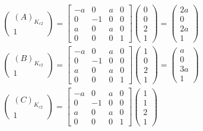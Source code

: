 \begin{gather}
	\begin{pmatrix}
		(A)_{K_{c2}}\\1
	\end{pmatrix}
	=
	\begin{bmatrix}
		-a&0&a&0\\
		0&-1&0&0\\
		a&0&a&0\\
		0&0&0&1
	\end{bmatrix}
	\begin{pmatrix}
		0\\0\\2\\1
	\end{pmatrix}
	=
	\begin{pmatrix}
		2a\\0\\2a\\1
	\end{pmatrix}\\
	\begin{pmatrix}
		(B)_{K_{c2}}\\1
	\end{pmatrix}
	=
	\begin{bmatrix}
		-a&0&a&0\\
		0&-1&0&0\\
		a&0&a&0\\
		0&0&0&1
	\end{bmatrix}
	\begin{pmatrix}
		1\\0\\2\\1
	\end{pmatrix}
	=
	\begin{pmatrix}
		a\\0\\3a\\1
	\end{pmatrix}\\
	\begin{pmatrix}
		(C)_{K_{c2}}\\1
	\end{pmatrix}
	=
	\begin{bmatrix}
		-a&0&a&0\\
		0&-1&0&0\\
		a&0&a&0\\
		0&0&0&1
	\end{bmatrix}
	\begin{pmatrix}
		1\\1\\2\\1

\end{pmatrix}
\end{gather}
